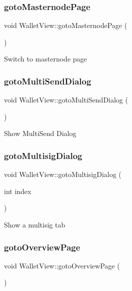 \subsubsection{\texorpdfstring{gotoMasternodePage}{gotoMasternodePage}}
{\footnotesize\ttfamily void Wallet\+View\+::goto\+Masternode\+Page (\begin{DoxyParamCaption}{ }\end{DoxyParamCaption})\hspace{0.3cm}{\ttfamily [slot]}}

Switch to masternode page \mbox{\label{class_wallet_view_abddf68fced738b62ad65d4e86ef54c4c}} 
\subsubsection{\texorpdfstring{gotoMultiSendDialog}{gotoMultiSendDialog}}
{\footnotesize\ttfamily void Wallet\+View\+::goto\+Multi\+Send\+Dialog (\begin{DoxyParamCaption}{ }\end{DoxyParamCaption})\hspace{0.3cm}{\ttfamily [slot]}}

Show Multi\+Send Dialog \mbox{\label{class_wallet_view_a73b3738ee4714ac1f461bfa84a249ab9}} 
\subsubsection{\texorpdfstring{gotoMultisigDialog}{gotoMultisigDialog}}
{\footnotesize\ttfamily void Wallet\+View\+::goto\+Multisig\+Dialog (\begin{DoxyParamCaption}\item[{int}]{index }\end{DoxyParamCaption})\hspace{0.3cm}{\ttfamily [slot]}}

Show a multisig tab \mbox{\label{class_wallet_view_ac9065162b1cf4700f733d1fb119bd973}} 
\subsubsection{\texorpdfstring{gotoOverviewPage}{gotoOverviewPage}}
{\footnotesize\ttfamily void Wallet\+View\+::goto\+Overview\+Page (\begin{DoxyParamCaption}{ }\end{DoxyParamCaption})\hspace{0.3cm}{\ttfamily [slot]}}

